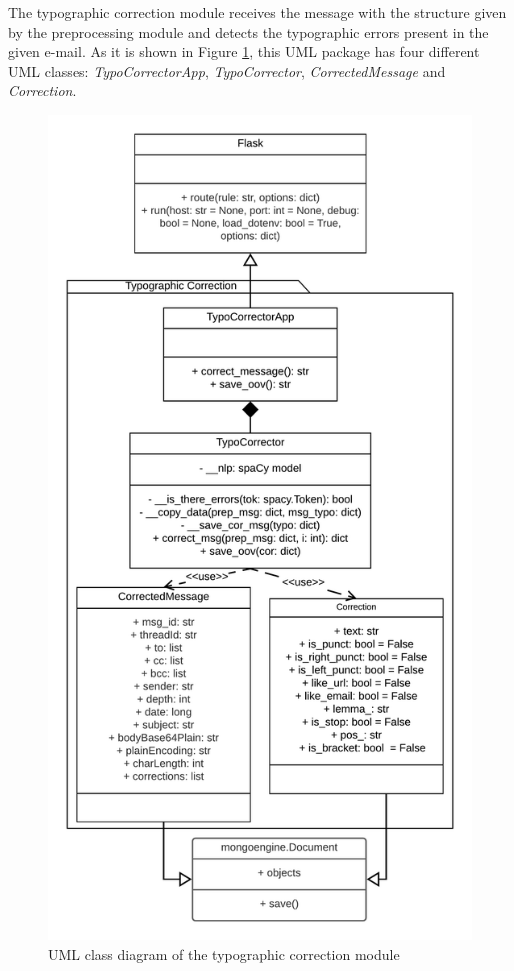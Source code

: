 The typographic correction module receives the message with the structure given by the preprocessing module and detects the typographic errors present in the given e-mail. As it is shown in Figure \ref{fig:umltypo}, this UML package has four different UML classes: \textit{TypoCorrectorApp}, \textit{TypoCorrector}, \textit{CorrectedMessage} and \textit{Correction}.

\begin{figure}[p]
	\centering%
	\centerline{\includegraphics[height=\textheight]{Imagenes/Bitmap/Analyser/typoUML.png}}%
	\caption{UML class diagram of the typographic correction module}%
	\label{fig:umltypo}
\end{figure}

